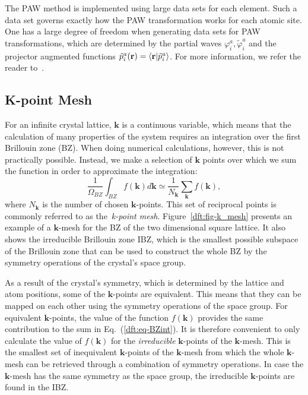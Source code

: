 \begin{refsection}
The \gls{PAW} method is implemented using large data sets for each element. Such a 
data set governs exactly how the \gls{PAW} transformation works for each atomic 
site. One has a large degree of freedom when generating data sets for \gls{PAW} 
transformations, which are determined by the partial waves 
$\varphi_i^a,\tilde{\varphi}_i^a$ and the projector augmented functions 
$\tilde{p}_i^a(\mathbf{r}) = \braket{\mathbf{r} |\tilde{p}_i^a}$. For more 
information, we refer the reader to~\cite{Rostgaard2009}. 
 
\subsection{K-point Mesh} \label{dft:sec-kpoints} 
 
For an infinite crystal lattice, $\mathbf{k}$ is a continuous variable, which 
means that the calculation of many properties of the system requires an 
integration over the first Brillouin zone (\gls{BZ}). When doing numerical 
calculations, however, this is not practically possible. Instead, we make a 
selection of $\mathbf{k}$ points over which we sum the function in order to 
approximate the integration: 
\begin{equation} \label{dft:eq-BZint} 
\frac{1}{\Omega_{BZ}}\int_{BZ} f(\mathbf{k}) d\mathbf{k} \simeq 
\frac{1}{N_\mathbf{k}} \sum_\mathbf{k} f(\mathbf{k}), 
\end{equation} 
where $N_\mathbf{k}$ is the number of chosen $\mathbf{k}$-points. This set of 
reciprocal points is commonly referred to as the~\textit{k-point mesh}. 
Figure~\ref{dft:fig-k_mesh} presents an example of a $\mathbf{k}$-mesh for the \gls{BZ} 
of the two dimensional square lattice. It also shows the irreducible 
Brillouin zone \gls{IBZ}, which is the smallest possible subspace of the 
Brillouin zone that can be used to construct the whole \gls{BZ} by the symmetry 
operations of the crystal's space group.  
 
As a result of the crystal's symmetry, which is determined by the lattice and 
atom positions, some of the $\mathbf{k}$-points are equivalent. This means 
that they can be mapped on each other using the symmetry operations of the 
space group. For equivalent $\mathbf{k}$-points, the value of the function 
$f(\mathbf{k})$ provides the same contribution to the sum in 
Eq.~(\ref{dft:eq-BZint}). It is therefore convenient to only calculate the value 
of $f(\mathbf{k})$ for the \textit{irreducible} $\mathbf{k}$-points of the 
$\mathbf{k}$-mesh. This is the smallest set of inequivalent 
$\mathbf{k}$-points of the $\mathbf{k}$-mesh from which the whole 
$\mathbf{k}$-mesh can be retrieved through a combination of symmetry 
operations. In case the $\mathbf{k}$-mesh has the same symmetry as the space 
group, the irreducible $\mathbf{k}$-points are found in the \gls{IBZ}. 
 

\end{refsection}
